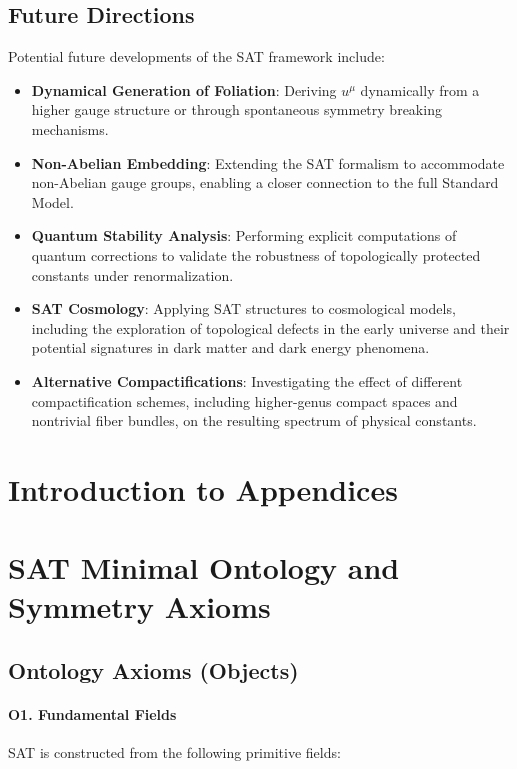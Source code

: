 \documentclass[12pt]{article}
\begin{document}
\subsection{Future Directions}

Potential future developments of the SAT framework include:

\begin{itemize}
    \item \textbf{Dynamical Generation of Foliation}: Deriving \( u^\mu \) dynamically from a higher gauge structure or through spontaneous symmetry breaking mechanisms.
    \item \textbf{Non-Abelian Embedding}: Extending the SAT formalism to accommodate non-Abelian gauge groups, enabling a closer connection to the full Standard Model.
    \item \textbf{Quantum Stability Analysis}: Performing explicit computations of quantum corrections to validate the robustness of topologically protected constants under renormalization.
    \item \textbf{SAT Cosmology}: Applying SAT structures to cosmological models, including the exploration of topological defects in the early universe and their potential signatures in dark matter and dark energy phenomena.
    \item \textbf{Alternative Compactifications}: Investigating the effect of different compactification schemes, including higher-genus compact spaces and nontrivial fiber bundles, on the resulting spectrum of physical constants.
\end{itemize}
\newpage



\section*{Introduction to Appendices}

\section*{SAT Minimal Ontology and Symmetry Axioms}

\subsection*{Ontology Axioms (Objects)}

\paragraph{O1. Fundamental Fields}
SAT is constructed from the following primitive fields:
\end{document}
